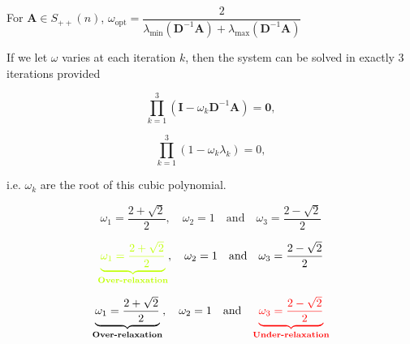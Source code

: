 \documentclass[aspectratio=169]{beamer}
\begin{document}
\begin{frame}
  \centering
  For $\bm{A} \in S_{++}(n)$, \(\omega_{\textrm{opt}} = \dfrac{2}{\lambda_{\min} (\bm{D}^{-1} \bm{A}) + \lambda_{\max} (\bm{D}^{-1} \bm{A})}\)

  \vspace{-1.5cm}
\end{frame}

\begin{frame}
  If we let $\omega$ varies at each iteration $k$, then the system can be solved in exactly 3 iterations provided
  \begin{overprint}
    \[
    \prod_{k=1}^3 \left( \bm{I} - \omega_k \bm{D}^{-1} \bm{A} \right) = \bm{0},
    \]

    \[
    \prod_{k=1}^3 \left( 1 - \omega_k \lambda_k \right) = 0,
    \]
  \end{overprint}

  \medskip

  i.e. $\omega_k$ are the root of this cubic polynomial.

  \vspace{-1cm}
\end{frame}

\begin{frame}
  \begin{overprint}
    \Large
    \[
    \omega_1 = \dfrac{2 + \sqrt{2}}{2}, \quad \omega_2 = 1 \quad \text{and} \quad \omega_3 = \dfrac{2 - \sqrt{2}}{2}
    \]

    \Large
    \[
    {\color{lime} \underbrace{\omega_1 = \dfrac{2 + \sqrt{2}}{2}}_{\textbf{Over-relaxation}}}, \quad \omega_2 = 1 \quad \text{and} \quad \omega_3 = \dfrac{2 - \sqrt{2}}{2}
    \]

    \Large
    \[
    \underbrace{\omega_1 = \dfrac{2 + \sqrt{2}}{2}}_{\textbf{Over-relaxation}}, \quad \omega_2 = 1 \quad \text{and} \quad {\color{red} \underbrace{\omega_3 = \dfrac{2 - \sqrt{2}}{2}}_{\color{red} \textbf{Under-relaxation}}}
    \]

  \end{overprint}

  \vspace{-1cm}
\end{frame}
\end{document}

